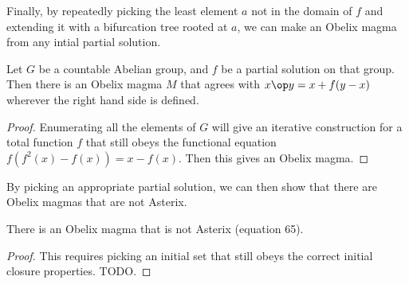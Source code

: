Finally, by repeatedly picking the least element $a$ not in the domain of $f$ and extending it with a bifurcation tree rooted at $a$, we can make an Obelix magma from any intial partial solution.
\begin{theorem}
Let $G$ be a countable Abelian group, and $f$ be a partial solution on that group. Then there is an Obelix magma $M$ that agrees with $x \op y = x + f(y-x)$ wherever the right hand side is defined.
\end{theorem}
\begin{proof}
Enumerating all the elements of $G$ will give an iterative construction for a total function $f$ that still obeys the functional equation $f(f^2(x) - f(x)) = x - f(x)$. Then this gives an Obelix magma.
\end{proof}

By picking an appropriate partial solution, we can then show that there are Obelix magmas that are not Asterix.
\begin{corollary}
There is an Obelix magma that is not Asterix (equation 65).
\end{corollary}
\begin{proof}
This requires picking an initial set that still obeys the correct initial closure properties. TODO.
\end{proof}
